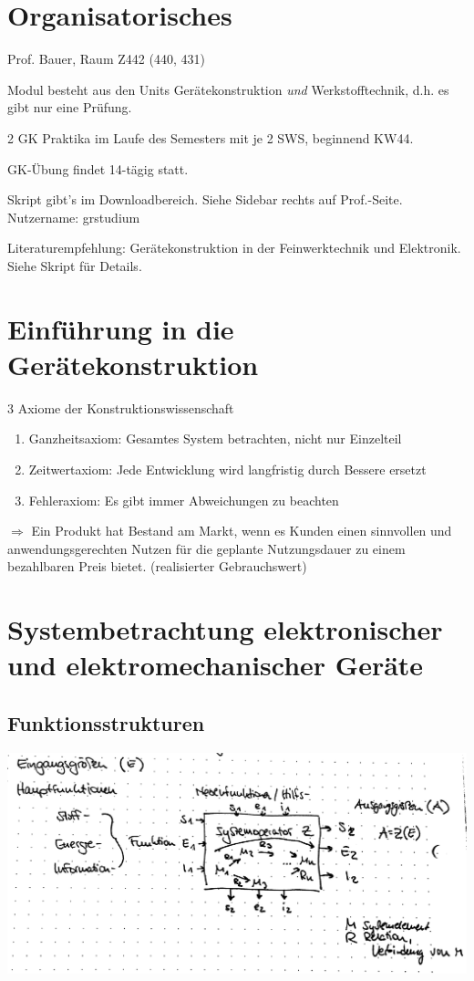 \section{Organisatorisches}
Prof. Bauer, Raum Z442 (440, 431)

Modul besteht aus den Units Gerätekonstruktion \emph{und} Werkstofftechnik, d.h. es gibt nur eine Prüfung.

2 GK Praktika im Laufe des Semesters mit je 2 SWS, beginnend KW44.

GK-Übung findet 14-tägig statt.

Skript gibt's im Downloadbereich. Siehe Sidebar rechts auf Prof.-Seite. \\Nutzername: grstudium

Literaturempfehlung: Gerätekonstruktion in der Feinwerktechnik und Elektronik. Siehe Skript für Details.

\section{Einführung in die Gerätekonstruktion}

3 Axiome der Konstruktionswissenschaft

\begin{enumerate}
	\item Ganzheitsaxiom:
		Gesamtes System betrachten, nicht nur Einzelteil
	\item Zeitwertaxiom:
		Jede Entwicklung wird langfristig durch Bessere ersetzt
	\item Fehleraxiom:
		Es gibt immer Abweichungen zu beachten
\end{enumerate}

$\Rightarrow$ Ein Produkt hat Bestand am Markt, wenn es Kunden einen sinnvollen und anwendungsgerechten Nutzen für die geplante Nutzungsdauer zu einem bezahlbaren Preis bietet. (realisierter Gebrauchswert)

\section{Systembetrachtung elektronischer und elektromechanischer Geräte}
\subsection{Funktionsstrukturen}


\begin{center}
	\includegraphics[width=.8\textwidth]{img/1_1}
\end{center}
